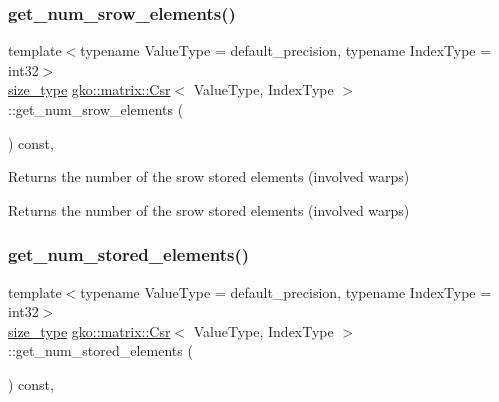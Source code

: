 \subsubsection{\texorpdfstring{get\+\_\+num\+\_\+srow\+\_\+elements()}{get\_num\_srow\_elements()}}
{\footnotesize\ttfamily template$<$typename Value\+Type = default\+\_\+precision, typename Index\+Type = int32$>$ \\
\hyperlink{namespacegko_a6e5c95df0ae4e47aab2f604a22d98ee7}{size\+\_\+type} \hyperlink{classgko_1_1matrix_1_1Csr}{gko\+::matrix\+::\+Csr}$<$ Value\+Type, Index\+Type $>$\+::get\+\_\+num\+\_\+srow\+\_\+elements (\begin{DoxyParamCaption}{ }\end{DoxyParamCaption}) const\hspace{0.3cm}{\ttfamily [inline]}, {\ttfamily [noexcept]}}



Returns the number of the srow stored elements (involved warps) 

\begin{DoxyReturn}{Returns}
the number of the srow stored elements (involved warps) 
\end{DoxyReturn}
\mbox{\label{classgko_1_1matrix_1_1Csr_ab70c085fc3df11a4ed9fe74b40844c5c}} 
\subsubsection{\texorpdfstring{get\+\_\+num\+\_\+stored\+\_\+elements()}{get\_num\_stored\_elements()}}
{\footnotesize\ttfamily template$<$typename Value\+Type = default\+\_\+precision, typename Index\+Type = int32$>$ \\
\hyperlink{namespacegko_a6e5c95df0ae4e47aab2f604a22d98ee7}{size\+\_\+type} \hyperlink{classgko_1_1matrix_1_1Csr}{gko\+::matrix\+::\+Csr}$<$ Value\+Type, Index\+Type $>$\+::get\+\_\+num\+\_\+stored\+\_\+elements (\begin{DoxyParamCaption}{ }\end{DoxyParamCaption}) const\hspace{0.3cm}{\ttfamily [inline]}, {\ttfamily [noexcept]}}




